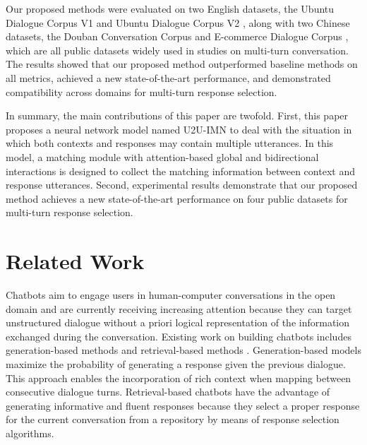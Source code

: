 \documentclass[journal]{IEEEtran}
\begin{document}
  Our proposed methods were evaluated on two English datasets, the Ubuntu Dialogue Corpus V1 \cite{DBLP:conf/sigdial/LowePSP15} and Ubuntu Dialogue Corpus V2 \cite{DBLP:journals/dad/LowePSCLP17}, along with two Chinese datasets, the Douban Conversation Corpus \cite{DBLP:conf/acl/WuWXZL17} and E-commerce Dialogue Corpus \cite{DBLP:conf/coling/ZhangLZZL18}, which are all public datasets widely used in studies on multi-turn conversation.
  The results showed that our proposed method outperformed baseline methods on all metrics, achieved a new state-of-the-art performance, and demonstrated compatibility across domains for multi-turn response selection.

  In summary, the main contributions of this paper are twofold. First, this paper proposes a neural network model named U2U-IMN to deal with the situation in which both contexts and responses may contain multiple utterances.
  In this model, a matching module with attention-based global and bidirectional interactions is designed to collect the matching information between context and response utterances.
  Second, experimental results demonstrate that our proposed method achieves a new state-of-the-art performance on four public datasets for multi-turn response selection.


\section{Related Work}
  Chatbots aim to engage users in human-computer conversations in the open domain and are currently receiving increasing attention because they can target unstructured dialogue without a priori logical representation of the information exchanged during the conversation. Existing work on building chatbots includes generation-based methods \cite{DBLP:conf/acl/ShangLL15,DBLP:conf/aaai/SerbanSBCP16,DBLP:journals/www/ZhangZWZL19,DBLP:conf/acl/ZhuCZWL19,DBLP:conf/ijcai/SongZCWL19} and retrieval-based methods \cite{DBLP:conf/sigdial/LowePSP15,DBLP:journals/corr/KadlecSK15,DBLP:journals/dad/LowePSCLP17,DBLP:conf/acl/WuWXZL17,DBLP:conf/acl/WuLCZDYZL18,DBLP:conf/coling/ZhangLZZL18}. Generation-based models maximize the probability of generating a response given the previous dialogue. This approach enables the incorporation of rich context when mapping between consecutive dialogue turns. Retrieval-based chatbots have the advantage of generating informative and fluent responses because they select a proper response for the current conversation from a repository by means of response selection algorithms.
\end{document}
